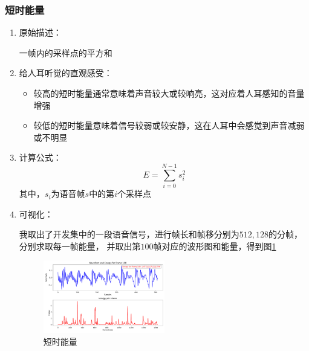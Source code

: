 \documentclass[a4paper]{article}
\begin{document}
\subsubsection{短时能量}
\begin{enumerate}
  \item 
  {
    原始描述：

    一帧内的采样点的平方和
  }
  \item 
  {
    给人耳听觉的直观感受：
    \begin{itemize}
      \item 较高的短时能量通常意味着声音较大或较响亮，这对应着人耳感知的音量增强
      \item 较低的短时能量意味着信号较弱或较安静，这在人耳中会感觉到声音减弱或不明显
    \end{itemize}
  }
  \item
  {
    计算公式：
    \begin{equation}
      E = \sum_{i=0}^{N-1}s_i^2
      \label{eq:energies}
    \end{equation}
    其中，$s_i$为语音帧$s$中的第$i$个采样点
  }
  \item
  {
    可视化：

    我取出了开发集中的一段语音信号，进行帧长和帧移分别为$512, 128$的分帧，分别求取每一帧能量，
    并取出第$100$帧对应的波形图和能量，得到图\ref{fig:energies}
    \begin{figure}
      \centering
      \includegraphics[width=0.5\textwidth]{figs/energies.pdf}
      \caption{短时能量}
      \label{fig:energies}
    \end{figure}
  }
\end{enumerate}
\end{document}
